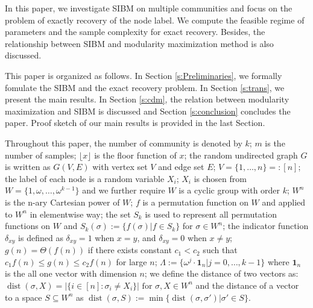 \documentclass[conference]{IEEEtran}
\newcommand{\ide}[2]{ \delta_{#1 #2} }
\DeclareMathOperator{\dist}{dist}
\begin{document}
	In this paper, we  investigate SIBM on multiple communities and focus on the problem of exactly recovery of the node label.
	We  compute the feasible regime of parameters and the sample complexity for exact recovery. Besides, the relationship between SIBM and modularity maximization method
	is also discussed. 
	
	This paper is organized as follows. In Section \ref{s:Preliminaries}, we formally fomulate the SIBM and the exact recovery problem.
	In Section \ref{s:trans}, we present the main results.
	In Section \ref{s:cdm}, the relation between modularity maximization and SIBM is discussed 
	and Section \ref{s:conclusion} concludes the paper.
	Proof sketch of our main results is provided in the last Section.
	
	Throughout this paper, the number of community is denoted by $k$; $m$ is the number of samples; $\lfloor x \rfloor$ is the floor function of $x$; the random undirected graph $G$ is written as $G(V,E)$ with vertex set $V$ and edge set $E$;
	$V=\{1,\dots, n\} =: [n]$;
	the label of each node is a random variable $X_i$; $X_i$ is chosen from $W= \{1, \omega, \dots, \omega^{k-1}\}$ and we further require $W$
	is a cyclic group with order $k$; $W^n$ is the n-ary Cartesian power of $W$; $f$ is a permutation function on $W$ and applied to $W^n$ in elementwise way; the set $S_k$ is used to represent all permutation functions on $W$ and $S_k(\sigma):=\{f(\sigma)| f\in S_k\}$ for $\sigma \in W^n$; the indicator function $\ide{x}{y}$ is defined as
	$\ide{x}{y} = 1 $ when $x=y$, and $\ide{x}{y}=0$ when $x\neq y$; $g(n) = \Theta(f(n))$ if there exists constant $c_1 < c_2$ such that $c_1 f(n) \leq g(n) \leq c_2 f(n)$
	for large $n$;
	$\Lambda := \{ \omega^j  \cdot \mathbf{1}_n | j=0, \dots,k-1\}$
	where $\mathbf{1}_n$ is the all one vector with dimension $n$;
	we define the distance of two vectors as:
	$\dist(\sigma, X)
	=|\{i\in[n]:\sigma_i\neq X_i\}| \textrm{ for } \sigma,X\in W^n
	$ and the distance of a vector to a space $S\subseteq W^n$
	as
	$\dist(\sigma,S)
	:=\min\{\dist(\sigma, \sigma') | \sigma' \in S\}
	$.
	
\end{document}
